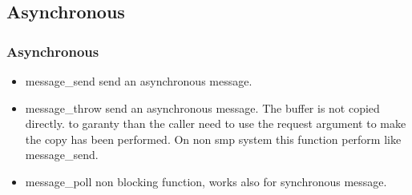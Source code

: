 \subsection{Asynchronous}
\begin{frame}
\frametitle{Asynchronous}
\begin{itemize}
\item message\_send send an asynchronous message.
\item message\_throw send an asynchronous message. The buffer is not
copied directly. to garanty than the caller need to use the request
argument to make the copy has been performed. On non smp system this
function perform like message\_send.
\item message\_poll non blocking function, works also for synchronous
message.
\end{itemize}
\end{frame}


